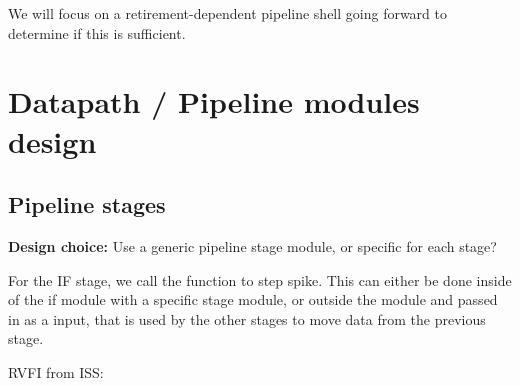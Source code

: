 We will focus on a retirement-dependent pipeline shell going forward to determine if this is sufficient. 





\section{Datapath / Pipeline modules design}

\subsection{Pipeline stages}

\textbf{Design choice:} Use a generic pipeline stage module, or specific for each stage?

For the IF stage, we call the function to step spike. This can either be done inside of the if module with a specific stage module, or outside the module and passed in as a  input, that is used by the other stages to move data from the previous stage.





RVFI from ISS: \textbf{}


